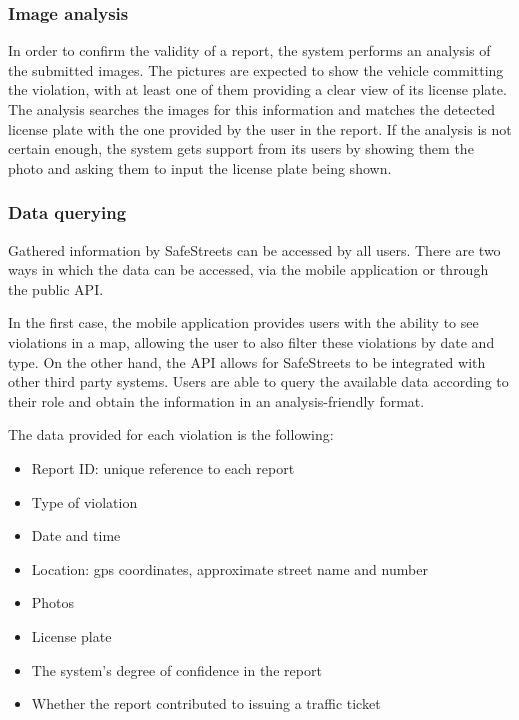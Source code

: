 \subsubsection{Image analysis}
In order to confirm the validity of a report, the system performs an analysis of the submitted images. The pictures are expected to show the vehicle committing the violation, with at least one of them providing a clear view of its license plate. The analysis searches the images for this information and matches the detected license plate with the one provided by the user in the report. If the analysis is not certain enough, the system gets support from its users by showing them the photo and asking them to input the license plate being shown.

\subsubsection{Data querying}

Gathered information by SafeStreets can be accessed by all users. There are two ways in which the data can be accessed, via the mobile application or through the public API.

In the first case, the mobile application provides users with the ability to see violations in a map, allowing the user to also filter these violations by date and type. 
On the other hand, the API allows for SafeStreets to be integrated with other third party systems. Users are able to query the available data according to their role and obtain the information in an analysis-friendly format.

The data provided for each violation is the following:
\begin{itemize}
\item Report ID: unique reference to each report
\item Type of violation
\item Date and time
\item Location: gps coordinates, approximate street name and number
\item Photos
\item License plate
\item The system’s degree of confidence in the report
\item Whether the report contributed to issuing a traffic ticket
\end{itemize}


